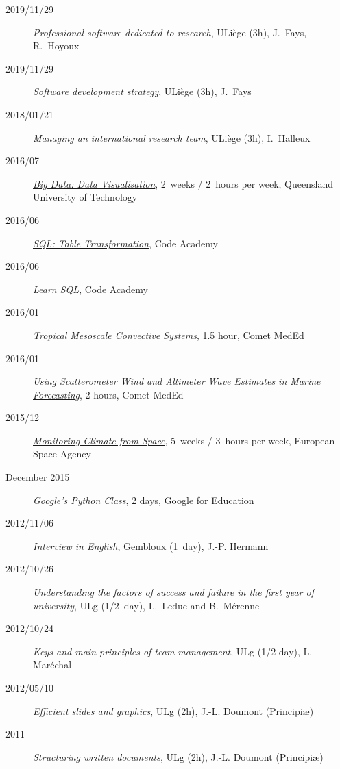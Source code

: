 \documentclass[11pt,a4paper,svgnames]{article}
\begin{document}
\begin{description}
\item[2019/11/29]{\textit{Professional software dedicated to research}, ULiège (3h), J.~Fays, R.~Hoyoux}
\item[2019/11/29]{\textit{Software development strategy}, ULiège (3h), J.~Fays}
\item[2018/01/21]{\textit{Managing an international research team}, ULiège (3h), I.~Halleux}
\item[2016/07]{\href{https://www.futurelearn.com/courses/big-data-visualisation}{\textit{Big Data: Data Visualisation}}, 2~weeks / 2~hours per week, Queensland University of Technology}
\item[2016/06]{\href{https://www.codecademy.com/learn/sql-table-transformation}{\textit{SQL: Table Transformation}}, Code Academy}
\item[2016/06]{\href{https://www.codecademy.com/learn/learn-sql}{\textit{Learn SQL}}, Code Academy}
\item[2016/01]{\href{https://www.meted.ucar.edu/training_module.php?id=993}{\textit{Tropical Mesoscale Convective Systems}}, 1.5 hour, Comet MedEd}
\item[2016/01]{\href{https://www.meted.ucar.edu/training_module.php?id=1093}{\textit{Using Scatterometer Wind and Altimeter Wave Estimates in Marine Forecasting}}, 2 hours, Comet MedEd}
\item[2015/12]{\href{https://www.futurelearn.com/courses/climate-from-space}{\textit{Monitoring Climate from Space}}, 5~weeks / 3~hours per week, European Space Agency}
\item[December 2015]{\href{https://developers.google.com/edu/python/?hl=en}{\textit{Google's Python Class}}, 2 days, Google for Education}
\item[2012/11/06]{\textit{Interview in English}, Gembloux (1~day), J.-P. Hermann}
\item[2012/10/26]{\textit{Understanding the factors of success and failure in the first year of university}, ULg (1/2~day), L.~Leduc and B.~M\'{e}renne}
\item[2012/10/24]{\textit{Keys and main principles of team management}, ULg  (1/2 day), L. Mar\'{e}chal}
\item[2012/05/10]{\textit{Efficient slides and graphics}, ULg (2h), J.-L. Doumont (Principi\ae)}

\item[2011]{\textit{Structuring written documents}, ULg (2h), J.-L. Doumont (Principi\ae)}
\end{description}
\end{document}
